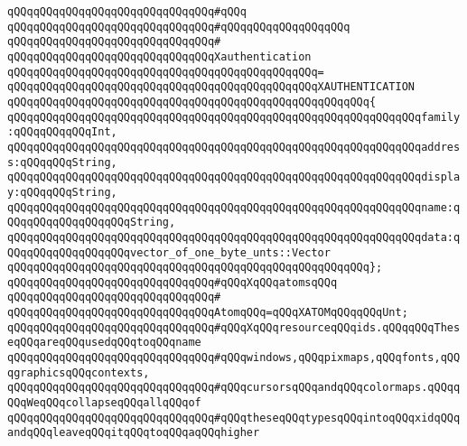 \verb|qQQqqQQqqQQqqQQqqQQqqQQqqQQqqQQq#qQQq|\newline
\verb|qQQqqQQqqQQqqQQqqQQqqQQqqQQqqQQq#qQQqqQQqqQQqqQQqqQQq|\newline
\verb|qQQqqQQqqQQqqQQqqQQqqQQqqQQqqQQq#|\newline
\verb|qQQqqQQqqQQqqQQqqQQqqQQqqQQqqQQqXauthentication|\newline
\verb|qQQqqQQqqQQqqQQqqQQqqQQqqQQqqQQqqQQqqQQqqQQqqQQq=|\newline
\verb|qQQqqQQqqQQqqQQqqQQqqQQqqQQqqQQqqQQqqQQqqQQqqQQqXAUTHENTICATION|\newline
\verb|qQQqqQQqqQQqqQQqqQQqqQQqqQQqqQQqqQQqqQQqqQQqqQQqqQQqqQQq{|\newline
\verb|qQQqqQQqqQQqqQQqqQQqqQQqqQQqqQQqqQQqqQQqqQQqqQQqqQQqqQQqqQQqqQQqfamily:qQQqqQQqqQQqInt,|\newline
\verb|qQQqqQQqqQQqqQQqqQQqqQQqqQQqqQQqqQQqqQQqqQQqqQQqqQQqqQQqqQQqqQQqaddress:qQQqqQQqString,|\newline
\verb|qQQqqQQqqQQqqQQqqQQqqQQqqQQqqQQqqQQqqQQqqQQqqQQqqQQqqQQqqQQqqQQqdisplay:qQQqqQQqString,|\newline
\verb|qQQqqQQqqQQqqQQqqQQqqQQqqQQqqQQqqQQqqQQqqQQqqQQqqQQqqQQqqQQqqQQqname:qQQqqQQqqQQqqQQqqQQqString,|\newline
\verb|qQQqqQQqqQQqqQQqqQQqqQQqqQQqqQQqqQQqqQQqqQQqqQQqqQQqqQQqqQQqqQQqdata:qQQqqQQqqQQqqQQqqQQqvector_of_one_byte_unts::Vector|\newline
\verb|qQQqqQQqqQQqqQQqqQQqqQQqqQQqqQQqqQQqqQQqqQQqqQQqqQQqqQQq};|\newline
\newline
\verb|qQQqqQQqqQQqqQQqqQQqqQQqqQQqqQQq#qQQqXqQQqatomsqQQq|\newline
\verb|qQQqqQQqqQQqqQQqqQQqqQQqqQQqqQQq#|\newline
\verb|qQQqqQQqqQQqqQQqqQQqqQQqqQQqqQQqAtomqQQq=qQQqXATOMqQQqqQQqUnt;|\newline
\newline
\verb|qQQqqQQqqQQqqQQqqQQqqQQqqQQqqQQq#qQQqXqQQqresourceqQQqids.qQQqqQQqTheseqQQqareqQQqusedqQQqtoqQQqname|\newline
\verb|qQQqqQQqqQQqqQQqqQQqqQQqqQQqqQQq#qQQqwindows,qQQqpixmaps,qQQqfonts,qQQqgraphicsqQQqcontexts,|\newline
\verb|qQQqqQQqqQQqqQQqqQQqqQQqqQQqqQQq#qQQqcursorsqQQqandqQQqcolormaps.qQQqqQQqWeqQQqcollapseqQQqallqQQqof|\newline
\verb|qQQqqQQqqQQqqQQqqQQqqQQqqQQqqQQq#qQQqtheseqQQqtypesqQQqintoqQQqxidqQQqandqQQqleaveqQQqitqQQqtoqQQqaqQQqhigher|\newline
